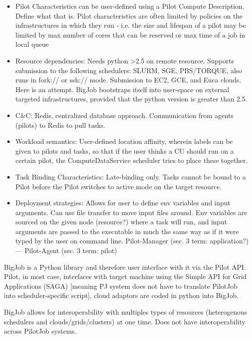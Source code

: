 \documentclass{sig-alternate}
\begin{document}
\begin{itemize}
\item Pilot Characteristics can be user-defined using a
Pilot Compute Description. Define what that is.
Pilot characteristics are often limited by policies on the infrastructures
in which they run - i.e. the size and lifespan of a
pilot may be limited by max number of cores
that can be reserved or max time of a job in local queue

\item Resource dependencies: Needs python >2.5 on remote
  resource. Supports submission to the following schedulers: SLURM,
  SGE, PBS/TORQUE, also runs in fork:// or ssh:// mode. Submission to
  EC2, GCE, and Euca clouds. Here is an attempt.  BigJob bootstraps
  itself into user-space on external targeted infrastructures,
  provided that the python version is greater than 2.5.

\item C\&C: Redis, centralized database approach. Communication from agents (pilots) to
Redis to pull tasks.

\item Workload semantics: User-defined location affinity, wherein labels
can be given to pilots and tasks, so that if the user thinks a CU
should run on a certain pilot, the ComputeDataService scheduler
tries to place these together.

\item Task Binding Characteristics: Late-binding only.  Tasks cannot
  be bound to a Pilot before the Pilot switches to active mode on the
  target resource.

\item Deployment strategies: Allows for user to define env variables and input arguments.
Can use file transfer to move input files around. Env variables are sourced
on the given node (resource?) where a task will run, and input arguments
are passed to the executable in much the same way as if it were typed
by the user on command line. Pilot-Manager (sec. 3 term: application?)
--- Pilot-Agent (sec. 3 term: pilot)
\end{itemize}


BigJob is a Python library and therefore user interface with it via the Pilot API.
Pilot, in most case, interfaces with target machine using the Simple API for
Grid Applications (SAGA) [meaning PJ system does not have to translate PilotJob
into scheduler-specific script], cloud adaptors are coded in python into
BigJob.

BigJob allows for interoperability with multiples types of resources
(heterogenous schedulers and clouds/grids/clusters) at one time.
Does not have interoperability across PilotJob systems.
\end{document}
